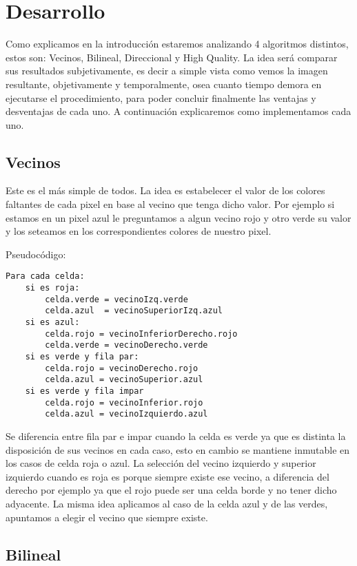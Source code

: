 \section{Desarrollo}

Como explicamos en la introducción estaremos analizando 4 algoritmos distintos, estos son: Vecinos, Bilineal, Direccional y High Quality. La idea será comparar sus resultados subjetivamente, es decir a simple vista como 
vemos la imagen resultante, objetivamente y temporalmente, osea cuanto tiempo demora en ejecutarse el procedimiento, para poder concluir finalmente las ventajas y desventajas de cada uno. A continuación explicaremos como 
implementamos cada uno.

\subsection{Vecinos}
Este es el más simple de todos. La idea es estabelecer el valor de los colores faltantes de cada pixel en base al vecino que tenga dicho valor. Por ejemplo si estamos en un pixel azul le preguntamos a algun vecino rojo y 
otro verde su valor y los seteamos en los correspondientes colores de nuestro pixel.

Pseudocódigo:
\begin{lstlisting}[frame=single] 
Para cada celda:
	si es roja:
		celda.verde = vecinoIzq.verde
		celda.azul  = vecinoSuperiorIzq.azul	
	si es azul:
		celda.rojo = vecinoInferiorDerecho.rojo
		celda.verde = vecinoDerecho.verde
	si es verde y fila par:
		celda.rojo = vecinoDerecho.rojo
		celda.azul = vecinoSuperior.azul
	si es verde y fila impar
		celda.rojo = vecinoInferior.rojo
		celda.azul = vecinoIzquierdo.azul
\end{lstlisting}

Se diferencia entre fila par e impar cuando la celda es verde ya que es distinta la disposición de sus vecinos en cada caso, esto en cambio se mantiene inmutable en los casos de celda roja o azul. La selección del
vecino izquierdo y superior izquierdo cuando es roja es porque siempre existe ese vecino, a diferencia del derecho por ejemplo ya que el rojo puede ser una celda borde y no tener dicho adyacente. La misma idea aplicamos 
al caso de la celda azul y de las verdes, apuntamos a elegir el vecino que siempre existe.

\subsection{Bilineal}

